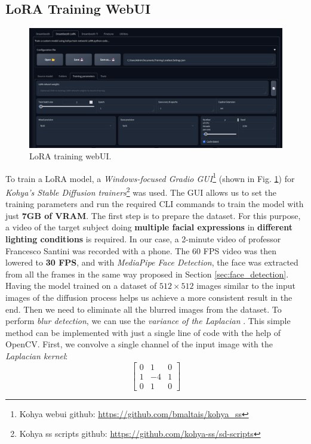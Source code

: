 \documentclass[preprint]{elsarticle}
\begin{document}
\subsection{LoRA Training WebUI} \label{sec:lora_training_webui}
\begin{figure}[H]
	\centering
	\includegraphics[width=15cm, keepaspectratio]{img/project_img/lora.png} 
	\caption{LoRA training webUI.}
	\label{fig:lora-webui}
\end{figure}
To train a LoRA model, a \emph{Windows-focused Gradio GUI}\footnote{Kohya webui github: \url{https://github.com/bmaltais/kohya_ss}}
(shown in Fig. \ref{fig:lora-webui}) 
for \emph{Kohya's Stable Diffusion trainers}\footnote{Kohya ss scripts github: \url{https://github.com/kohya-ss/sd-scripts}} was used. 
The GUI allows us to set the training parameters and run the required 
CLI commands to train the model with just \textbf{7GB of VRAM}. 
The first step is to prepare the dataset. For this purpose, 
a video of the target subject doing \textbf{multiple facial expressions} in \textbf{different lighting conditions} 
is required. In our case, a 2-minute video of professor Francesco Santini was recorded with a phone. 
The 60 FPS video was then lowered to \textbf{30 FPS}, and with \emph{MediaPipe Face Detection},
the face was extracted from all the frames in the same way proposed in Section \ref{sec:face_detection}.
Having the model trained on a dataset of $512\times 512$ images similar to the input images 
of the diffusion process helps us achieve a more consistent result in the end. 
Then we need to eliminate all the blurred images from the dataset. 
To perform \emph{blur detection}, we can use the \emph{variance of the Laplacian} \cite{903548}. 
This simple method can be implemented with just a single line of code with the help of OpenCV. 
First, we convolve a single channel of the input image with the \emph{Laplacian kernel}:
\begin{equation}
	\begin{bmatrix}
		0 & 1 & 0\\
		1 & -4 & 1\\
		0 & 1 & 0
	\end{bmatrix}
\end{equation}
\end{document}
